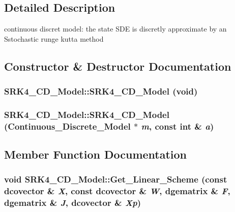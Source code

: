 \subsection{Detailed Description}
continuous discret model: the state SDE is discretly approximate by an Sstochastic runge kutta method 

\subsection{Constructor \& Destructor Documentation}
\hypertarget{class_s_r_k4___c_d___model_52708f290c0dfb41c8de289c2e716cb3}{
\subsubsection[{SRK4\_\-CD\_\-Model}]{\setlength{\rightskip}{0pt plus 5cm}SRK4\_\-CD\_\-Model::SRK4\_\-CD\_\-Model (void)}}
\label{class_s_r_k4___c_d___model_52708f290c0dfb41c8de289c2e716cb3}


\hypertarget{class_s_r_k4___c_d___model_e1ae17aa1fe147b7da45493f2d4db40c}{
\subsubsection[{SRK4\_\-CD\_\-Model}]{\setlength{\rightskip}{0pt plus 5cm}SRK4\_\-CD\_\-Model::SRK4\_\-CD\_\-Model ({\bf Continuous\_\-Discrete\_\-Model} $\ast$ {\em m}, \/  const int \& {\em a})}}
\label{class_s_r_k4___c_d___model_e1ae17aa1fe147b7da45493f2d4db40c}




\subsection{Member Function Documentation}
\hypertarget{class_s_r_k4___c_d___model_c348e8a59d0880ac366190004f4df36b}{
\subsubsection[{Get\_\-Linear\_\-Scheme}]{\setlength{\rightskip}{0pt plus 5cm}void SRK4\_\-CD\_\-Model::Get\_\-Linear\_\-Scheme (const dcovector \& {\em X}, \/  const dcovector \& {\em W}, \/  dgematrix \& {\em F}, \/  dgematrix \& {\em J}, \/  dcovector \& {\em Xp})}}
\label{class_s_r_k4___c_d___model_c348e8a59d0880ac366190004f4df36b}



